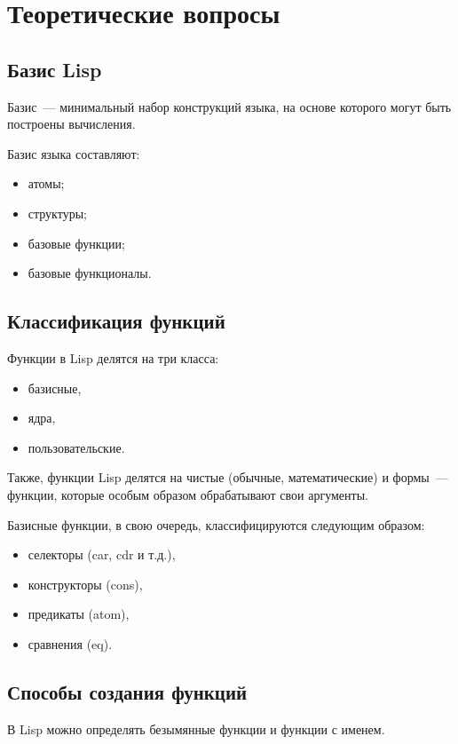 \chapter{Теоретические вопросы}

\section{Базис Lisp}

Базис~--- минимальный набор конструкций языка, на основе которого могут быть построены вычисления.

Базис языка составляют:
\begin{itemize}
	\item атомы;
	\item структуры;
	\item базовые функции;
	\item базовые функционалы.
\end{itemize}

\section{Классификация функций}

Функции в Lisp делятся на три класса:
\begin{itemize}
	\item базисные,
	\item ядра,
	\item пользовательские.
\end{itemize}

Также, функции Lisp делятся на чистые (обычные, математические) и формы~--- функции, которые особым образом обрабатывают свои аргументы.

Базисные функции, в свою очередь, классифицируются следующим образом:
\begin{itemize}
	\item селекторы (car, cdr и т.д.),
	\item конструкторы (cons),
	\item предикаты (atom),
	\item сравнения (eq).
\end{itemize}

\section{Способы создания функций}

В Lisp можно определять безымянные функции и функции с именем.

